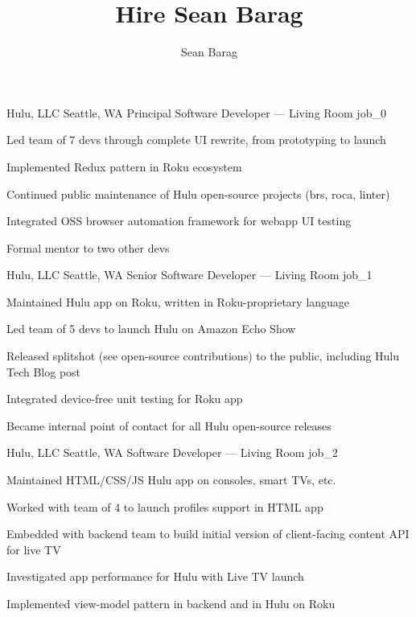 \documentclass[10pt]{barag_resume}
\title{Hire Sean Barag}
\author{Sean Barag}
\begin{document}
\relax
    \renewcommand{\labelitemi}{$\cdot$}\relax %
    \begin{job}{Hulu, LLC}
        {Seattle, WA}
        {Principal Software Developer --- Living Room}
        {job_0}
            \begin{itemize*}
                \item Led team of 7 devs through complete UI rewrite, from prototyping to launch
                \item Implemented Redux pattern in Roku ecosystem
                \item Continued public maintenance of Hulu open-source projects (brs, roca, linter)
                \item Integrated OSS browser automation framework for webapp UI testing
                \item Formal mentor to two other devs
            \end{itemize*}
    \end{job}

    \begin{job}{Hulu, LLC}
        {Seattle, WA}
        {Senior Software Developer --- Living Room}
        {job_1}
            \begin{itemize*}
                \item Maintained Hulu app on Roku, written in Roku-proprietary language
                \item Led team of 5 devs to launch Hulu on Amazon Echo Show
                \item Released splitshot (see open-source contributions) to the public, including Hulu Tech Blog post
                \item Integrated device-free unit testing for Roku app
                \item Became internal point of contact for all Hulu open-source releases
            \end{itemize*}
    \end{job}

    \begin{job}{Hulu, LLC}
        {Seattle, WA}
        {Software Developer --- Living Room}
        {job_2}
            \begin{itemize*}
                \item Maintained HTML/CSS/JS Hulu app on consoles, smart TVs, etc.
                \item Worked with team of 4 to launch profiles support in HTML app
                \item Embedded with backend team to build initial version of client-facing content API for live TV
                \item Investigated app performance for Hulu with Live TV launch
                \item Implemented view-model pattern in backend and in Hulu on Roku
            \end{itemize*}
    \end{job}
\end{document}
